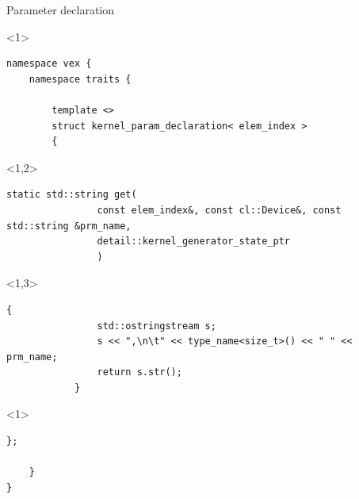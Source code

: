 \documentclass[@BEAMER_OPTIONS@]{beamer}
\begin{document}
\note{ }

\begin{frame}[fragile]{Parameter declaration}
    \begin{exampleblock}{}
        \begin{uncoverenv}<1>
            \begin{lstlisting}
namespace vex {
    namespace traits {

        template <>
        struct kernel_param_declaration< elem_index >
        {
            \end{lstlisting}
        \end{uncoverenv}
        \begin{uncoverenv}<1,2>
            \begin{lstlisting}[firstnumber=last]
            static std::string get(
                const elem_index&, const cl::Device&, const std::string &prm_name,
                detail::kernel_generator_state_ptr
                )
            \end{lstlisting}
        \end{uncoverenv}
        \begin{uncoverenv}<1,3>
            \begin{lstlisting}[firstnumber=last]
            {
                std::ostringstream s;
                s << ",\n\t" << type_name<size_t>() << " " << prm_name;
                return s.str();
            }
            \end{lstlisting}
        \end{uncoverenv}
        \begin{uncoverenv}<1>
            \begin{lstlisting}[firstnumber=last]
        };

    }
}
            \end{lstlisting}
        \end{uncoverenv}
    \end{exampleblock}
\end{frame}

\note{ }
\end{document}
